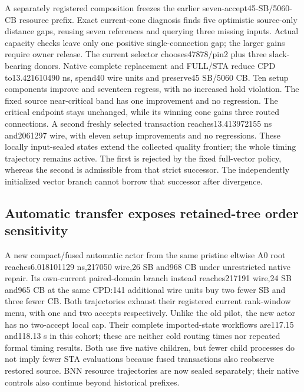 \documentclass[conference,10pt]{IEEEtran}
\begin{document}
A separately registered composition freezes the earlier seven-accept45-SB/5060-CB resource prefix. Exact current-cone diagnosis finds five optimistic source-only distance gaps, reusing seven references and querying three missing inputs. Actual capacity checks leave only one positive single-connection gap; the larger gains require owner release. The current selector chooses47878/pin2 plus three slack-bearing donors. Native complete replacement and FULL/STA reduce CPD to13.421610490 ns, spend40 wire units and preserve45 SB/5060 CB. Ten setup components improve and seventeen regress, with no increased hold violation. The fixed source near-critical band has one improvement and no regression. The critical endpoint stays unchanged, while its winning cone gains three routed connections. A second freshly selected transaction reaches13.413972155 ns and2061297 wire, with eleven setup improvements and no regressions. These locally input-sealed states extend the collected quality frontier; the whole timing trajectory remains active. The first is rejected by the fixed full-vector policy, whereas the second is admissible from that strict successor. The independently initialized vector branch cannot borrow that successor after divergence.

\subsection{Automatic transfer exposes retained-tree order sensitivity}
A new compact/fused automatic actor from the same pristine eltwise A0 root reaches6.018101129 ns,217050 wire,26 SB and968 CB under unrestricted native repair. Its own-current paired-domain branch instead reaches217191 wire,24 SB and965 CB at the same CPD:141 additional wire units buy two fewer SB and three fewer CB. Both trajectories exhaust their registered current rank-window menu, with one and two accepts respectively. Unlike the old pilot, the new actor has no two-accept local cap. Their complete imported-state workflows are117.15 and118.13 s in this cohort; these are neither cold routing times nor repeated formal timing results. Both use five native children, but fewer child processes do not imply fewer STA evaluations because fused transactions also reobserve restored source. BNN resource trajectories are now sealed separately; their native controls also continue beyond historical prefixes.
\end{document}
